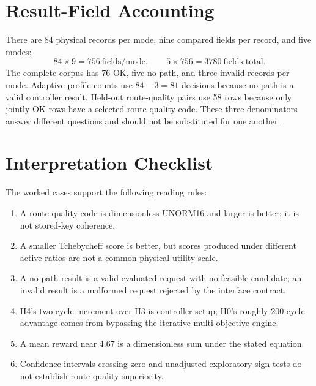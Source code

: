 \section{Result-Field Accounting}

There are 84 physical records per mode, nine compared fields per record, and five
modes:
\begin{equation}
84\times9=756\ \text{fields/mode},\qquad
5\times756=3780\ \text{fields total}.
\end{equation}
The complete corpus has 76 OK, five no-path, and three invalid records per mode.
Adaptive profile counts use $84-3=81$ decisions because no-path is a valid
controller result. Held-out route-quality pairs use 58 rows because only jointly OK
rows have a selected-route quality code. These three denominators answer different
questions and should not be substituted for one another.

\section{Interpretation Checklist}

The worked cases support the following reading rules:
\begin{enumerate}
  \item A route-quality code is dimensionless UNORM16 and larger is better; it is
  not stored-key coherence.
  \item A smaller Tchebycheff score is better, but scores produced under different
  active ratios are not a common physical utility scale.
  \item A no-path result is a valid evaluated request with no feasible candidate;
  an invalid result is a malformed request rejected by the interface contract.
  \item H4's two-cycle increment over H3 is controller setup; H0's roughly
  200-cycle advantage comes from bypassing the iterative multi-objective engine.
  \item A mean reward near 4.67 is a dimensionless sum under the stated equation.
  \item Confidence intervals crossing zero and unadjusted exploratory sign tests do
  not establish route-quality superiority.
\end{enumerate}
